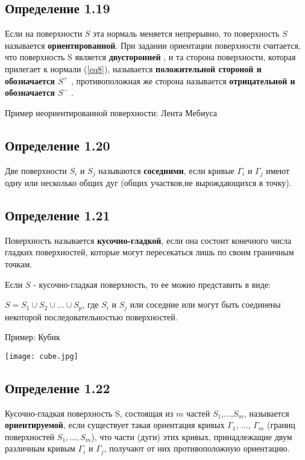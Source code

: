 \documentclass[12pt]{article}
\begin{document}
\subsection*{Определение 1.19}
Если на поверхности $S$ эта нормаль
меняется непрерывно, то поверхность $S$ называется \textbf{ориентированной}. При задании ориентации поверхности считается, что поверхность S является \textbf{ двусторонней }, и та сторона поверхности,
которая прилегает к нормали (\ref{eq8}), называется 
\textbf{ положительной стороной и обозначается $S^+$ }, противоположная же сторона называется 
\textbf{ отрицательной и обозначается $S^-$ }	.

Пример неориентированной поверхности: Лента Мебиуса
	

\subsection*{Определение 1.20}

Две поверхности $S_i$ и $S_j$ называются \textbf{соседними}, если кривые
$\Gamma_i$ и $\Gamma_j$ имеют одну или несколько общих дуг (общих участков,не вырождающихся в точку).

\subsection*{Определение 1.21 }
Поверхность называется \textbf{кусочно-гладкой}, если она состоит конечного числа гладких поверхностей, которые могут пересекаться лишь по своим граничным точкам.

Если $S$ - кусочно-гладкая поверхность, то ее можно представить в виде:

	$S = S_1 \cup S_2 \cup ... \cup S_p$, где $S_i$ и $S_j$ или соседние или могут быть соединены некоторой последовательностью поверхностей.
	
	Пример: Кубик
	
\texttt{[image: cube.jpg]}

\subsection*{Определение 1.22 }
Кусочно-гладкая поверхность S, состоящая из $m$ частей
$S_1$,...,$S_m$, называется \textbf{ориентируемой}, если существует такая ориентация кривых $\Gamma_1$, ..., $\Gamma_m$ (границ поверхностей $S_1,...,S_m$), что
части (дуги) этих кривых, принадлежащие двум различным кривым
$\Gamma_i$ и $\Gamma_j$, получают от них противоположную ориентацию.
\end{document}
